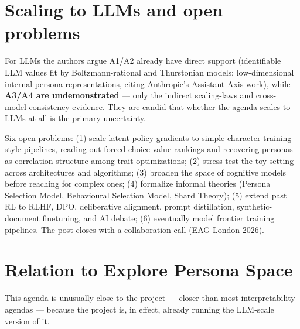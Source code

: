 \documentclass[11pt]{article}
\begin{document}
\section{Scaling to LLMs and open problems}
\label{sec:llm}

For LLMs the authors argue A1/A2 already have direct support (identifiable LLM values fit by Boltzmann-rational and Thurstonian models; low-dimensional internal persona representations, citing Anthropic's Assistant-Axis work), while \textbf{A3/A4 are undemonstrated} --- only the indirect scaling-laws and cross-model-consistency evidence. They are candid that whether the agenda scales to LLMs at all is the primary uncertainty.

Six open problems: (1) scale latent policy gradients to simple character-training-style pipelines, reading out forced-choice value rankings and recovering personas as correlation structure among trait optimizations; (2) stress-test the toy setting across architectures and algorithms; (3) broaden the space of cognitive models before reaching for complex ones; (4) formalize informal theories (Persona Selection Model, Behavioural Selection Model, Shard Theory); (5) extend past RL to RLHF, DPO, deliberative alignment, prompt distillation, synthetic-document finetuning, and AI debate; (6) eventually model frontier training pipelines. The post closes with a collaboration call (EAG London 2026).

\section{Relation to Explore Persona Space}
\label{sec:eps}

This agenda is unusually close to the project --- closer than most interpretability agendas --- because the project is, in effect, already running the LLM-scale version of it.
\end{document}

